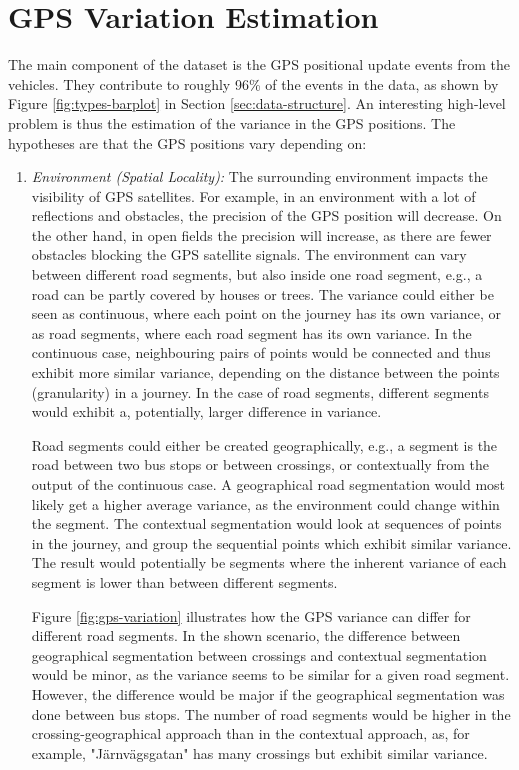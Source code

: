 \chapter{GPS Variation Estimation}
\label{cha:GPS-variation-estimation}

The main component of the dataset is the GPS positional update events from the vehicles.
They contribute to roughly 96\% of the events in the data, as shown by Figure \ref{fig:types-barplot} in Section \ref{sec:data-structure}.
An interesting high-level problem is thus the estimation of the variance in the GPS positions.
The hypotheses are that the GPS positions vary depending on:
\begin{enumerate}
    \item \textit{Environment (Spatial Locality):} 
    The surrounding environment impacts the visibility of GPS satellites. 
    For example, in an environment with a lot of reflections and obstacles, the precision of the GPS position will decrease.
    On the other hand, in open fields the precision will increase, as there are fewer obstacles blocking the GPS satellite signals.
    The environment can vary between different road segments, but also inside one road segment, e.g., a road can be partly covered by houses or trees.
    The variance could either be seen as continuous, where each point on the journey has its own variance, or as road segments, where each road segment has its own variance.
    In the continuous case, neighbouring pairs of points would be connected and thus exhibit more similar variance, depending on the distance between the points (granularity) in a journey.
    In the case of road segments, different segments would exhibit a, potentially, larger difference in variance.
    
    Road segments could either be created geographically, e.g., a segment is the road between two bus stops or between crossings, or contextually from the output of the continuous case.
    A geographical road segmentation would most likely get a higher average variance, as the environment could change within the segment.
    The contextual segmentation would look at sequences of points in the journey, and group the sequential points which exhibit similar variance.
    The result would potentially be segments where the inherent variance of each segment is lower than between different segments.

    Figure \ref{fig:gps-variation} illustrates how the GPS variance can differ for different road segments.
    In the shown scenario, the difference between geographical segmentation between crossings and contextual segmentation would be minor, as the variance seems to be similar for a given road segment.
    However, the difference would be major if the geographical segmentation was done between bus stops.
    The number of road segments would be higher in the crossing-geographical approach than in the contextual approach, as, for example, "Järnvägsgatan" has many crossings but exhibit similar variance. 
    


\end{enumerate}

